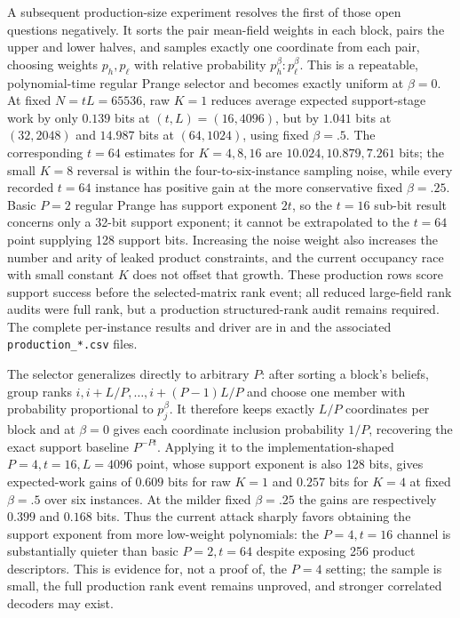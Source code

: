 A subsequent production-size experiment resolves the first of those open
questions negatively.  It sorts the pair mean-field weights in each block,
pairs the upper and lower halves, and samples exactly one coordinate from each
pair, choosing weights $p_h,p_\ell$ with relative probability
$p_h^\beta:p_\ell^\beta$.  This is a repeatable, polynomial-time regular
Prange selector and becomes exactly uniform at $\beta=0$.  At fixed
$N=tL=65536$, raw $K=1$ reduces average expected support-stage work by only
$0.139$ bits at $(t,L)=(16,4096)$, but by $1.041$ bits at $(32,2048)$ and
$14.987$ bits at $(64,1024)$, using fixed $\beta=.5$.  The corresponding
$t=64$ estimates for $K=4,8,16$ are $10.024,10.879,7.261$ bits; the small
$K=8$ reversal is within the four-to-six-instance sampling noise, while every
recorded $t=64$ instance has positive gain at the more conservative fixed
$\beta=.25$.  Basic $P=2$ regular Prange has support exponent $2t$, so the
$t=16$ sub-bit result concerns only a 32-bit support exponent; it cannot be
extrapolated to the $t=64$ point supplying 128 support bits.  Increasing the
noise weight also increases the number and arity of leaked product
constraints, and the current occupancy race with small constant $K$ does not
offset that growth.  These production rows score support success before the
selected-matrix rank event; all reduced large-field rank audits were full
rank, but a production structured-rank audit remains required.  The complete
per-instance results and driver are in
 and the
associated \texttt{production\_*.csv} files.

The selector generalizes directly to arbitrary $P$: after sorting a block's
beliefs, group ranks $i,i+L/P,\ldots,i+(P-1)L/P$ and choose one member with
probability proportional to $p_j^\beta$.  It therefore keeps exactly $L/P$
coordinates per block and at $\beta=0$ gives each coordinate inclusion
probability $1/P$, recovering the exact support baseline $P^{-Pt}$.  Applying
it to the implementation-shaped $P=4,t=16,L=4096$ point, whose support
exponent is also 128 bits, gives expected-work gains of $0.609$ bits for raw
$K=1$ and $0.257$ bits for $K=4$ at fixed $\beta=.5$ over six instances.  At
the milder fixed $\beta=.25$ the gains are respectively $0.399$ and $0.168$
bits.  Thus the current attack sharply favors obtaining the support exponent
from more low-weight polynomials: the $P=4,t=16$ channel is substantially
quieter than basic $P=2,t=64$ despite exposing 256 product descriptors.  This
is evidence for, not a proof of, the $P=4$ setting; the sample is small, the
full production rank event remains unproved, and stronger correlated decoders
may exist.

